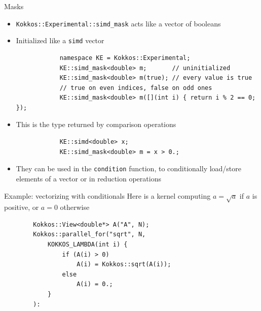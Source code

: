 \documentclass[
    aspectratio=169,
]{beamer}
\begin{document}
\begin{frame}[fragile]{Masks}
    \begin{itemize}
        \item \texttt{Kokkos::Experimental::simd\_mask} acts like a vector of booleans
        \item Initialized like a \texttt{simd} vector
        \begin{verbatim}
            namespace KE = Kokkos::Experimental;
            KE::simd_mask<double> m;       // uninitialized
            KE::simd_mask<double> m(true); // every value is true
            // true on even indices, false on odd ones
            KE::simd_mask<double> m([](int i) { return i % 2 == 0; });
        \end{verbatim}
        \item This is the type returned by comparison operations
        \begin{verbatim}
            KE::simd<double> x;
            KE::simd_mask<double> m = x > 0.;
        \end{verbatim}
        \item They can be used in the \texttt{condition} function, to conditionally load/store elements of a vector or in reduction operations
    \end{itemize}
    \vspace{0.5em}
\end{frame}

\begin{frame}[fragile]{Example: vectorizing with conditionals}
    Here is a kernel computing $a = \sqrt{a}$ if $a$ is positive, or $a = 0$ otherwise
    \begin{verbatim}
        Kokkos::View<double*> A("A", N);
        Kokkos::parallel_for("sqrt", N,
            KOKKOS_LAMBDA(int i) {
                if (A(i) > 0)
                    A(i) = Kokkos::sqrt(A(i));
                else
                    A(i) = 0.;
            }
        ):
    \end{verbatim}
\end{frame}
\end{document}
